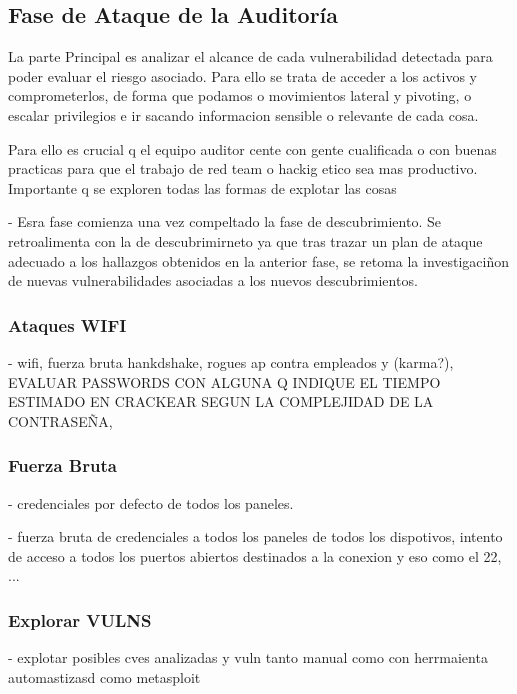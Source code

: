 \documentclass[a4paper, 11pt]{article}
\begin{document}
\clearpage




\subsection{Fase de Ataque de la Auditoría}

La parte Principal es analizar el alcance de cada vulnerabilidad detectada para poder evaluar el riesgo asociado. Para ello se trata de 
acceder a los activos y comprometerlos, de forma que podamos o movimientos lateral y pivoting, o escalar privilegios e ir sacando informacion sensible o relevante de cada cosa.

Para ello es crucial q el equipo auditor cente con gente cualificada o con buenas practicas para que el trabajo de red team o hackig etico sea mas productivo.
Importante q se exploren todas las formas de explotar las cosas

-   Esra fase comienza una vez compeltado la fase de descubrimiento. Se retroalimenta con la de descubrimirneto ya que tras trazar un plan de ataque adecuado a los hallazgos obtenidos en la anterior fase, se retoma la investigaciñon de nuevas vulnerabilidades asociadas a los nuevos descubrimientos.

\subsubsection{Ataques WIFI}

- wifi, fuerza bruta hankdshake, rogues ap contra empleados y (karma?), EVALUAR PASSWORDS CON ALGUNA Q INDIQUE EL TIEMPO ESTIMADO EN CRACKEAR SEGUN 
  LA COMPLEJIDAD DE LA CONTRASEÑA,


\subsubsection{Fuerza Bruta}

- credenciales por defecto de todos los paneles.

- fuerza bruta de credenciales a todos los paneles de todos los dispotivos, intento de acceso a todos los puertos abiertos destinados a la conexion y eso como el 22, ...

\subsubsection{Explorar VULNS}

-  explotar posibles cves analizadas y vuln tanto manual como con herrmaienta automastizasd como metasploit
\end{document}
